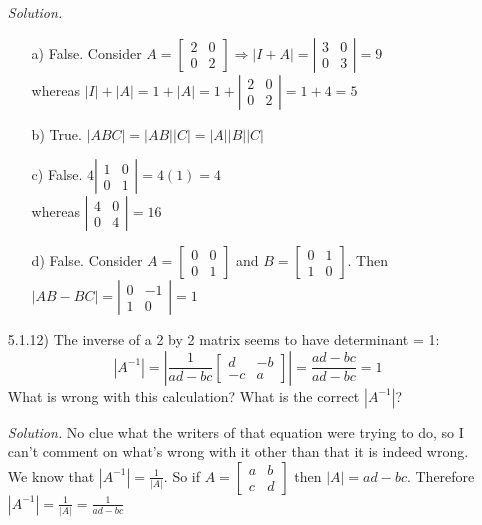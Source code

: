 \documentclass[12pt,pdftex]{article}
\begin{document}
\begin{itemize}
\textit{Solution.}
\begin{itemize}
\item[a)] False. Consider $A=\left[\begin{array}{ccc} 2 & 0 \\ 0 & 2\end{array}\right] \Rightarrow |I+A|=\left|\begin{array}{ccc} 3 & 0 \\ 0 & 3\end{array}\right|=9$ \\whereas $|I|+|A|=1+|A|=1+\left|\begin{array}{ccc} 2 & 0 \\ 0 & 2\end{array}\right|=1+4=5$
\item[b)] True. $|ABC|=|AB||C|=|A||B||C|$
\item[c)] False. $4\left|\begin{array}{ccc} 1 & 0 \\ 0 & 1\end{array}\right|=4(1)=4$\\whereas
		  $\left|\begin{array}{ccc} 4 & 0 \\ 0 & 4\end{array}\right|=16$
\item[d)] False. Consider $A=\left[\begin{array}{ccc} 0 & 0 \\ 0 & 1\end{array}\right]$ and $B=\left[\begin{array}{ccc} 0 & 1 \\ 1 & 0\end{array}\right]$. Then $|AB-BC|=\left|\begin{array}{ccc} 0 & -1 \\ 1 & 0\end{array}\right|=1$
\end{itemize}

\item[5.1.12)] The inverse of a 2 by 2 matrix seems to have determinant = 1:
\[|A^{-1}|=\left|\frac{1}{ad-bc}\left[\begin{array}{rr} d & -b \\ -c & a\end{array}\right]\right|=\frac{ad-bc}{ad-bc}=1\]
What is wrong with this calculation? What is the correct $|A^{-1}|$?

\textit{Solution.} No clue what the writers of that equation were trying to do, so I can't comment on what's wrong with it other than that it is indeed wrong. We know that $|A^{-1}|=\frac{1}{|A|}$. So if $A=\left[\begin{array}{ccc} a & b \\ c & d\end{array}\right]$ then $|A|=ad-bc$. Therefore $|A^{-1}|=\frac{1}{|A|}=\frac{1}{ad-bc}$


\end{itemize}
\end{document}
